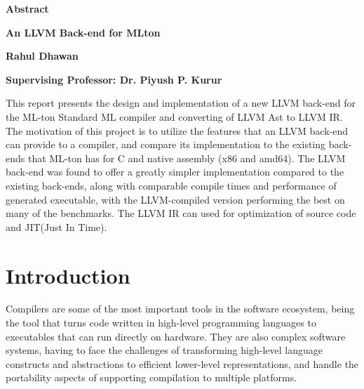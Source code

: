 \documentclass{book}
\begin{document}
\thispagestyle{plain}
\begin{center}
    
    \huge{\textbf{Abstract}}
 
    \vspace{0.4cm}
    \large
    \textbf{An LLVM Back-end for MLton}
    
    \vspace{0.4cm}
    \textbf{Rahul Dhawan}
 
    \vspace{0.4cm}
    \textbf{Supervising Professor: Dr. Piyush P. Kurur }
    
    \vspace{1.0cm}
    \justify
    This report presents the design and implementation of a new LLVM back-end for the ML-ton Standard ML compiler and converting of LLVM Ast to LLVM IR.  The motivation of this project is to utilize the features that an LLVM back-end can provide to a compiler, and compare its implementation to the existing back-ends that ML-ton has for C and native assembly (x86 and amd64).  The LLVM back-end was found to offer a greatly simpler implementation compared to the existing back-ends, along with comparable compile times and performance of generated executable, with the LLVM-compiled version performing the best on many of the benchmarks. The LLVM IR can used for optimization of source code and JIT(Just In Time).
\end{center}

\tableofcontents

\chapter{Introduction}
   \Large
   Compilers are some of the most important tools in the software ecosystem, being the tool
that turns code written in high-level programming languages to executables that can run directly on hardware. They are also complex software systems, having to face the challenges
of transforming high-level language constructs and abstractions to efficient lower-level representations, and handle the portability aspects of supporting compilation to multiple platforms.
\end{document}
